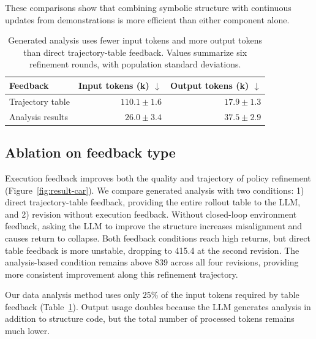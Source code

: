 These comparisons show that combining symbolic structure with continuous updates from demonstrations is more efficient than either component alone.



\begin{table}
\centering
\small
\setlength{\tabcolsep}{4pt}
\begin{tabular}{@{}lrr@{}}
\toprule
\bf Feedback & \bf \shortstack{Input\\tokens (k) $\downarrow$} & \bf \shortstack{Output\\tokens (k) $\downarrow$} \\
\midrule
Trajectory table & $110.1\pm1.6$ & $17.9\pm1.3$ \\
Analysis results & $26.0\pm3.4$ & $37.5\pm2.9$ \\
\bottomrule
\end{tabular}
\caption{Generated analysis uses fewer input tokens and more output tokens than direct trajectory-table feedback.
Values summarize six refinement rounds, with population standard deviations.}
\label{tab:tokens}
\end{table}

\subsection{Ablation on feedback type}
\label{sec:feedback-results}

Execution feedback improves both the quality and trajectory of policy refinement (Figure~\ref{fig:result-car}).
We compare generated analysis with two conditions: 1) direct trajectory-table feedback, providing the entire rollout table to the LLM, and 2) revision without execution feedback.
Without closed-loop environment feedback, asking the LLM to improve the structure increases misalignment and causes return to collapse.
Both feedback conditions reach high returns, but direct table feedback is more unstable, dropping to 415.4 at the second revision.
The analysis-based condition remains above 839 across all four revisions, providing more consistent improvement along this refinement trajectory.

Our data analysis method uses only $25\%$ of the input tokens required by table feedback (Table~\ref{tab:tokens}).
Output usage doubles because the LLM generates analysis in addition to structure code, but the total number of processed tokens remains much lower.
